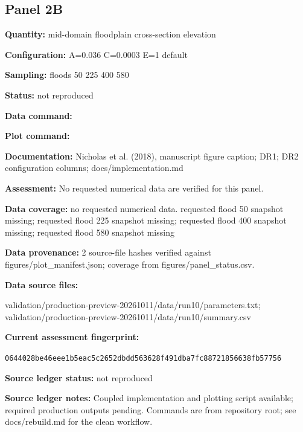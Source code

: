 \subsection*{Panel 2B}
\textbf{Quantity:} mid-domain floodplain cross-section elevation

\textbf{Configuration:} A=0.036 C=0.0003 E=1 default

\textbf{Sampling:} floods 50 225 400 580

\textbf{Status:} not reproduced

\textbf{Data command:}\par {\small \texttt{}}\par

\textbf{Plot command:}\par {\small \texttt{}}\par

\textbf{Documentation:} Nicholas et al. (2018), manuscript figure caption; DR1; DR2 configuration columns; docs/\allowbreak{}implementation.md

\textbf{Assessment:} No requested numerical data are verified for this panel.

\textbf{Data coverage:} no requested numerical data. requested flood 50 snapshot missing; requested flood 225 snapshot missing; requested flood 400 snapshot missing; requested flood 580 snapshot missing

\textbf{Data provenance:} 2 source-file hashes verified against figures/\allowbreak{}plot\_\allowbreak{}manifest.json; coverage from figures/\allowbreak{}panel\_\allowbreak{}status.csv.

\textbf{Data source files:}\par {\small\raggedright validation/\allowbreak{}production-preview-20261011/\allowbreak{}data/\allowbreak{}run10/\allowbreak{}parameters.txt; validation/\allowbreak{}production-preview-20261011/\allowbreak{}data/\allowbreak{}run10/\allowbreak{}summary.csv\par}

\textbf{Current assessment fingerprint:}\par {\small\texttt{0644028be46eee1b5eac5c2652dbdd563628f491dba7fc88721856638fb57756}}\par

\textbf{Source ledger status:} not reproduced

\textbf{Source ledger notes:} Coupled implementation and plotting script available; required production outputs pending. Commands are from repository root; see docs/\allowbreak{}rebuild.md for the clean workflow.

